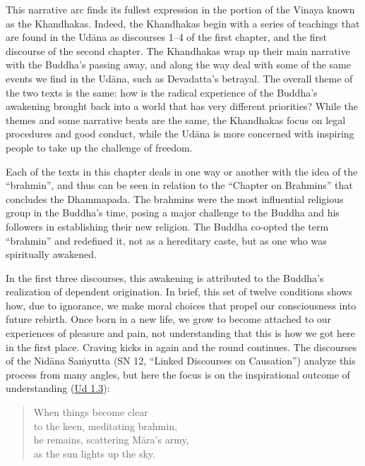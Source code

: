 \documentclass[12pt,openany]{book}%
\begin{document}
This narrative arc finds its fullest expression in the portion of the Vinaya known as the Khandhakas. Indeed, the Khandhakas begin with a series of teachings that are found in the \textsanskrit{Udāna} as discourses 1–4 of the first chapter, and the first discourse of the second chapter. The Khandhakas wrap up their main narrative with the Buddha’s passing away, and along the way deal with some of the same events we find in the \textsanskrit{Udāna}, such as Devadatta’s betrayal. The overall theme of the two texts is the same: how is the radical experience of the Buddha’s awakening brought back into a world that has very different priorities? While the themes and some narrative beats are the same, the Khandhakas focus on legal procedures and good conduct, while the \textsanskrit{Udāna} is more concerned with inspiring people to take up the challenge of freedom.

Each of the texts in this chapter deals in one way or another with the idea of the “brahmin”, and thus can be seen in relation to the “Chapter on Brahmins” that concludes the Dhammapada. The brahmins were the most influential religious group in the Buddha’s time, posing a major challenge to the Buddha and his followers in establishing their new religion. The Buddha co-opted the term “brahmin” and redefined it, not as a hereditary caste, but as one who was spiritually awakened. 

In the first three discourses, this awakening is attributed to the Buddha’s realization of dependent origination. In brief, this set of twelve conditions shows how, due to ignorance, we make moral choices that propel our consciousness into future rebirth. Once born in a new life, we grow to become attached to our experiences of pleasure and pain, not understanding that this is how we got here in the first place. Craving kicks in again and the round continues. The discourses of the \textsanskrit{Nidāna} \textsanskrit{Saṁyutta} (SN 12, “Linked Discourses on Causation”) analyze this process from many angles, but here the focus is on the inspirational outcome of understanding (\href{https://suttacentral.net/ud1.3/en/sujato}{Ud 1.3}):

\begin{quotation}%
When things become clear \\
to the keen, meditating brahmin, \\
he remains, scattering \textsanskrit{Māra}’s army, \\
as the sun lights up the sky.

%
\end{quotation}
\end{document}
